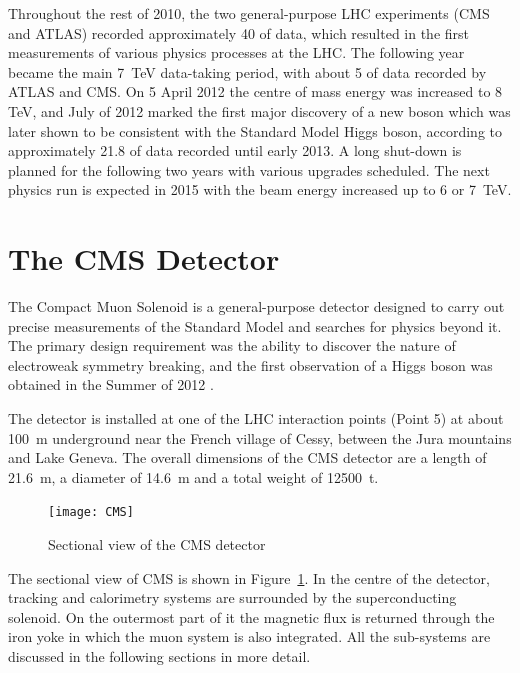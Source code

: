 Throughout the rest of 2010, the two general-purpose LHC experiments (CMS and ATLAS) recorded approximately
\SI{40}{\invpb} of data, which resulted in the first measurements of various physics processes at the LHC. The following
year became the main \SI{7}{\TeV} data-taking period, with about \SI{5}{\invfb} of data recorded by ATLAS and CMS. On 5
April 2012 the centre of mass energy was increased to 8 TeV, and July of 2012 marked the first major discovery of a new
boson which was later shown to be consistent with the Standard Model Higgs boson, according to approximately
\SI{21.8}{\invfb} of data recorded until early 2013. A long shut-down is planned for the following two years with
various upgrades scheduled. The next physics run is expected in 2015 with the beam energy increased up to 6 or
\SI{7}{\TeV}.

\newpage
\section{The CMS Detector}
\label{s:CMS}

The Compact Muon Solenoid \autocite{CMS} is a general-purpose detector designed to carry out precise measurements of the
Standard Model and searches for physics beyond it. The primary design requirement was the ability to discover the nature
of electroweak symmetry breaking, and the first observation of a Higgs boson was obtained in the Summer of 2012
\autocite{CMS_higgs_observation}.

The detector is installed at one of the LHC interaction points (Point 5) at about \SI{100}{\metre} underground near the
French village of Cessy, between the Jura mountains and Lake Geneva. The overall dimensions of the CMS detector are a
length of \SI{21.6}{\metre}, a diameter of \SI{14.6}{\metre} and a total weight of \SI{12500}{\tonne}.

\begin{figure}[htbp]
  \centering
  \leavevmode
  \texttt{[image: CMS]}
  \caption{Sectional view of the CMS detector}
  \label{fig:CMS}
\end{figure}

The sectional view of CMS is shown in Figure~\ref{fig:CMS}. In the centre of the detector, tracking and calorimetry
systems are surrounded by the superconducting solenoid. On the outermost part of it the magnetic flux is returned
through the iron yoke in which the muon system is also integrated. All the sub-systems are discussed in the following
sections in more detail.

